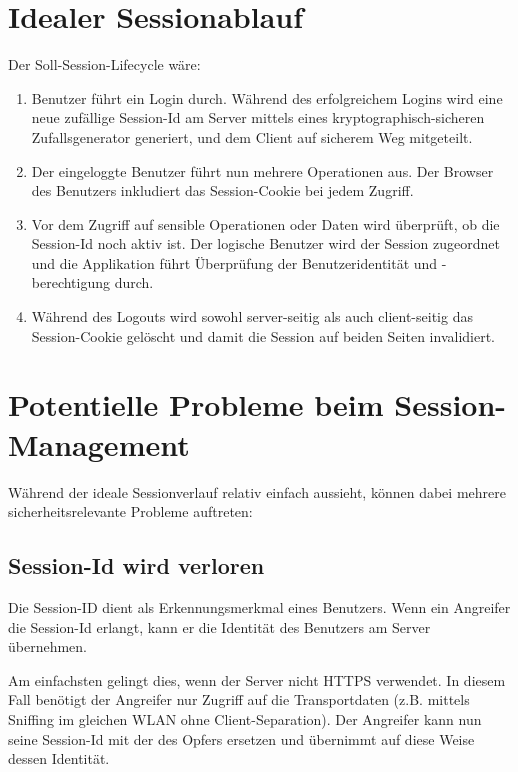 \section{Idealer Sessionablauf}

Der Soll-Session-Lifecycle wäre:

\begin{enumerate}
	\item Benutzer führt ein Login durch. Während des erfolgreichem Logins wird eine neue zufällige Session-Id am Server mittels eines kryptographisch-sicheren Zufallsgenerator generiert, und dem Client auf sicherem Weg mitgeteilt.
	\item Der eingeloggte Benutzer führt nun mehrere Operationen aus. Der Browser des Benutzers inkludiert das Session-Cookie bei jedem Zugriff.
	\item Vor dem Zugriff auf sensible Operationen oder Daten wird überprüft, ob die Session-Id noch aktiv ist. Der logische Benutzer wird der Session zugeordnet und die Applikation führt Überprüfung der Benutzeridentität und -berechtigung durch.
	\item Während des Logouts wird sowohl server-seitig als auch client-seitig das Session-Cookie gelöscht und damit die Session auf beiden Seiten invalidiert.
\end{enumerate}

\section{Potentielle Probleme beim Session-Management}

Während der ideale Sessionverlauf relativ einfach aussieht, können dabei mehrere sicherheitsrelevante Probleme auftreten:

\subsection{Session-Id wird verloren}

Die Session-ID dient als Erkennungsmerkmal eines Benutzers. Wenn ein Angreifer die Session-Id erlangt, kann er die Identität des Benutzers am Server übernehmen.

Am einfachsten gelingt dies, wenn der Server nicht HTTPS verwendet. In diesem Fall benötigt der Angreifer nur Zugriff auf die Transportdaten (z.B. mittels Sniffing im gleichen WLAN ohne Client-Separation). Der Angreifer kann nun seine Session-Id mit der des Opfers ersetzen und übernimmt auf diese Weise dessen Identität.

